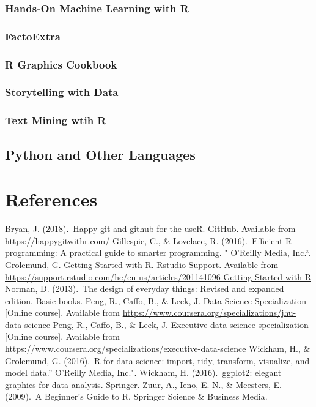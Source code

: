 \documentclass[
]{book}
\begin{document}
\hypertarget{hands-on-machine-learning-with-r}{%
\subsection{Hands-On Machine Learning with R}\label{hands-on-machine-learning-with-r}}

\hypertarget{factoextra}{%
\subsection{FactoExtra}\label{factoextra}}

\hypertarget{r-graphics-cookbook}{%
\subsection{R Graphics Cookbook}\label{r-graphics-cookbook}}

\hypertarget{storytelling-with-data}{%
\subsection{Storytelling with Data}\label{storytelling-with-data}}

\hypertarget{text-mining-wtih-r}{%
\subsection{Text Mining wtih R}\label{text-mining-wtih-r}}

\hypertarget{python-and-other-languages}{%
\section{Python and Other Languages}\label{python-and-other-languages}}

\hypertarget{references}{%
\chapter*{References}\label{references}}

Bryan, J. (2018).~Happy git and github for the useR. GitHub. Available from \url{https://happygitwithr.com/}
Gillespie, C., \& Lovelace, R. (2016).~Efficient R programming: A practical guide to smarter programming. " O'Reilly Media, Inc.``.
Grolemund, G. Getting Started with R. Rstudio Support. Available from \url{https://support.rstudio.com/hc/en-us/articles/201141096-Getting-Started-with-R}
Norman, D. (2013).~The design of everyday things: Revised and expanded edition. Basic books.
Peng, R., Caffo, B., \& Leek, J. Data Science Specialization {[}Online course{]}. Available from \url{https://www.coursera.org/specializations/jhu-data-science}
Peng, R., Caffo, B., \& Leek, J. Executive data science specialization {[}Online course{]}. Available from \url{https://www.coursera.org/specializations/executive-data-science}
Wickham, H., \& Grolemund, G. (2016).~R for data science: import, tidy, transform, visualize, and model data.'' O'Reilly Media, Inc.".
Wickham, H. (2016).~ggplot2: elegant graphics for data analysis. Springer.
Zuur, A., Ieno, E. N., \& Meesters, E. (2009).~A Beginner's Guide to R. Springer Science \& Business Media.
\end{document}
